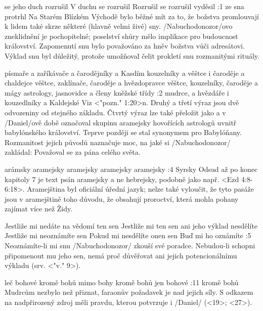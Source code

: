     {se jeho duch rozrušil} %
    {V duchu se rozrušil}  %
    {Rozrušil se} %
    {rozrušil}  %
    {vyděsil}  %
:1 {ze sna protrhl} Na Starém Blízkém Východě bylo běžné mít za to, že božstva promlouvají k lidem také skrze některé (hlavně velmi živé) sny. \x/Nabuchodonozor/ovo zneklidnění je pochopitelné; poselství shůry mělo implikace pro budoucnost království. Zapomenutí snu bylo považováno za hněv božstva vůči adresátovi. Výklad snu byl důležitý, protože umožňoval čelit prokletí snu rozmanitými rituály.


    {písmaře a zaříkávače a čarodějníky a Kasdím} %
    {kouzelníky a věštce i čaroděje a chaldejce}  %
    {věštce, zaklínače, čaroděje a hvězdopravce} %
    {věštce, kouzelníky, čaroděje a mágy}  %
    {astrology, jasnovidce a členy kněžské třídy}  %
:2 {mudrce, a hvězdáře i kouzedlníky a Kaldejské} Viz <"pozn." 1:20>n. 
Druhý a třetí výraz jsou dvě odvozeniny od stejného základu. Čtvrtý výraz lze také přeložit jako  a v \x/Daniel/ově době označoval skupinu aramejsky hovořících astrologů uvnitř babylónského království. Teprve později se stal synonymem pro Babylóňany. %
Rozmanitost jejich původů naznačuje moc, na jaké si \x/Nabuchodonozor/ zakládal: Považoval se za pána celého světa.


    {arámsky} %
    {aramejsky}  %
    {aramejsky} %
    {aramejsky}  %
    {aramejsky}  %
:4 {Syrsky} Odsud až po konec kapitoly 7 je text psán aramejsky a ne hebrejsky, podobně jako např.  <Ezd 4:8-6:18>. Aramejština byl oficiální úřední jazyk; nelze také vyloučit, že tyto pasáže jsou v aramejštině toho důvodu,  že obsahují proroctví, která mohla pohany zajímat více než Židy.

    {Jestliže mi nedáte na vědomí ten sen} %
    {Jestliže mi ten sen ani jeho výklad nesdělíte}  %
    {Jestliže mi neoznámíte sen} %
    {Pokud mi nesdělíte onen sen}  %
    {Buď mi ho oznámíte}  %
:5 {Neoznámíte-li mi snu} \x/Nabuchodonozor/ zkouší své poradce. Nebudou-li schopni připomenout mu jeho sen, nemá proč důvěřovat ani jejich potencionálnímu výkladu (srv. <"v." 9>).


    {leč bohové} %
    {kromě bohů}  %
    {mimo bohy} %
    {kromě bohů}  %
    {jen bohové}  %
:11 {kromě bohů} Mudrcům nezbylo než přiznat, faraonův požadavek je nad jejich síly. S odkazem na nadpřirozený zdroj měli pravdu, kterou potvrzuje i \x/Daniel/ (<19>; <27>).


